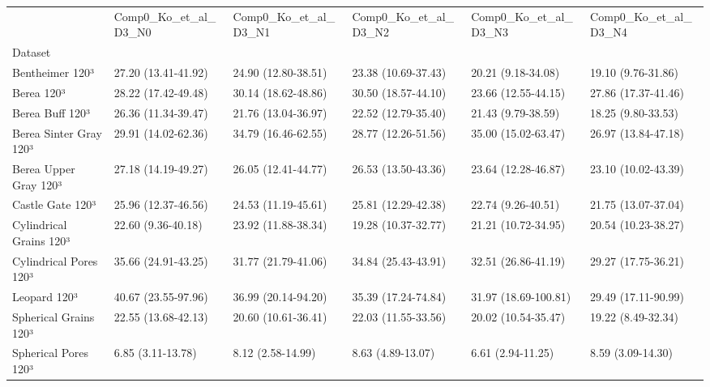 \begin{tabular}{llllll}
\toprule
 & Comp0_Ko_et_al_D3_N0 & Comp0_Ko_et_al_D3_N1 & Comp0_Ko_et_al_D3_N2 & Comp0_Ko_et_al_D3_N3 & Comp0_Ko_et_al_D3_N4 \\
Dataset &  &  &  &  &  \\
\midrule
Bentheimer 120³ & 27.20 (13.41-41.92) & 24.90 (12.80-38.51) & 23.38 (10.69-37.43) & 20.21 (9.18-34.08) & 19.10 (9.76-31.86) \\
Berea 120³ & 28.22 (17.42-49.48) & 30.14 (18.62-48.86) & 30.50 (18.57-44.10) & 23.66 (12.55-44.15) & 27.86 (17.37-41.46) \\
Berea Buff 120³ & 26.36 (11.34-39.47) & 21.76 (13.04-36.97) & 22.52 (12.79-35.40) & 21.43 (9.79-38.59) & 18.25 (9.80-33.53) \\
Berea Sinter Gray 120³ & 29.91 (14.02-62.36) & 34.79 (16.46-62.55) & 28.77 (12.26-51.56) & 35.00 (15.02-63.47) & 26.97 (13.84-47.18) \\
Berea Upper Gray 120³ & 27.18 (14.19-49.27) & 26.05 (12.41-44.77) & 26.53 (13.50-43.36) & 23.64 (12.28-46.87) & 23.10 (10.02-43.39) \\
Castle Gate 120³ & 25.96 (12.37-46.56) & 24.53 (11.19-45.61) & 25.81 (12.29-42.38) & 22.74 (9.26-40.51) & 21.75 (13.07-37.04) \\
Cylindrical Grains 120³ & 22.60 (9.36-40.18) & 23.92 (11.88-38.34) & 19.28 (10.37-32.77) & 21.21 (10.72-34.95) & 20.54 (10.23-38.27) \\
Cylindrical Pores 120³ & 35.66 (24.91-43.25) & 31.77 (21.79-41.06) & 34.84 (25.43-43.91) & 32.51 (26.86-41.19) & 29.27 (17.75-36.21) \\
Leopard 120³ & 40.67 (23.55-97.96) & 36.99 (20.14-94.20) & 35.39 (17.24-74.84) & 31.97 (18.69-100.81) & 29.49 (17.11-90.99) \\
Spherical Grains 120³ & 22.55 (13.68-42.13) & 20.60 (10.61-36.41) & 22.03 (11.55-33.56) & 20.02 (10.54-35.47) & 19.22 (8.49-32.34) \\
Spherical Pores 120³ & 6.85 (3.11-13.78) & 8.12 (2.58-14.99) & 8.63 (4.89-13.07) & 6.61 (2.94-11.25) & 8.59 (3.09-14.30) \\
\bottomrule
\end{tabular}
